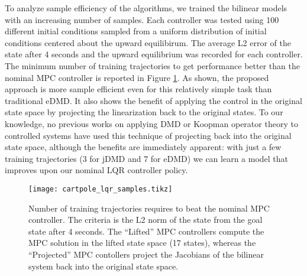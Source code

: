 \documentclass{article}
\begin{document}
To analyze sample efficiency of the algorithms, we trained the bilinear models with an 
increasing number of samples. Each controller was tested using 100 different initial
conditions sampled from a uniform distribution of initial conditions centered about the 
upward equilibirum. The average L2 error of the state after 4 seconds and the upward 
equilibrium was recorded for each controller. The minimum number of training trajectories to
get performance better than the nominal MPC controller is reported in Figure 
\ref{fig:cartpole_lqr_samples}. As shown, the proposed approach is more sample efficient 
even for this relatively simple task than traditional eDMD. It also shows the benefit of 
applying the control in the original state space by projecting the linearization back to the
original states. To our knowledge, no previous works on applying DMD or Koopman operator 
theory to controlled systems have used this technique of projecting back into the original 
state space, although the benefits are immediately apparent: with just a few training 
trajectories (3 for jDMD and 7 for eDMD) we can learn a model that improves upon our nominal
LQR controller policy.

\begin{figure}
  \centering
  \texttt{[image: cartpole\_lqr\_samples.tikz]}
  \caption{Number of training trajectories requires to beat the nominal MPC controller.
    The criteria is the L2 norm of the state from the goal state after 4 seconds.
    The ``Lifted'' MPC controllers compute the MPC solution in the lifted state space 
    (17 states), whereas the ``Projected'' MPC contollers project the Jacobians of the 
    bilinear system back into the original state space.
  }
  \label{fig:cartpole_lqr_samples}
\end{figure}
\end{document}
